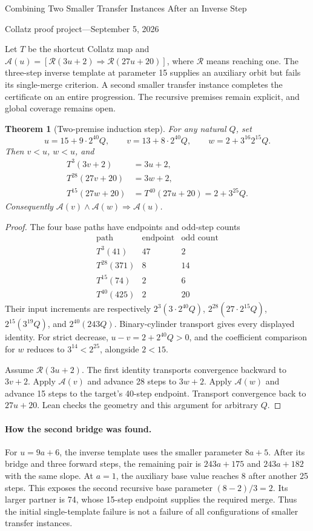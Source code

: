 \documentclass[10pt]{article}
\newtheorem{theorem}{Theorem}
\newcommand{\R}{\mathcal R}
\newcommand{\A}{\mathcal A}
\begin{document}
\begin{center}
{\Large Combining Two Smaller Transfer Instances After an Inverse Step}\par\medskip
Collatz proof project\quad---\quad September 5, 2026
\end{center}
Let $T$ be the shortcut Collatz map and
$\A(u)=[\R(3u+2)\Rightarrow\R(27u+20)]$, where $\R$ means reaching one.
The three-step inverse template at parameter 15 supplies an auxiliary orbit
but fails its single-merge criterion. A second smaller transfer instance
completes the certificate on an entire progression. The recursive premises
remain explicit, and global coverage remains open.

\begin{theorem}[Two-premise induction step]
For any natural $Q$, set
\[
 u=15+9\cdot2^{40}Q,\qquad
 v=13+8\cdot2^{40}Q,\qquad
 w=2+3^{16}2^{15}Q.
\]
Then $v<u$, $w<u$, and
\begin{align*}
 T^3(3v+2)&=3u+2,\\
 T^{28}(27v+20)&=3w+2,\\
 T^{15}(27w+20)&=T^{40}(27u+20)=2+3^{25}Q.
\end{align*}
Consequently $\A(v)\land\A(w)\Rightarrow\A(u)$.
\end{theorem}
\begin{proof}
The four base paths have endpoints and odd-step counts
\[
\begin{array}{c|c|c}
\text{path}&\text{endpoint}&\text{odd count}\\\hline
T^3(41)&47&2\\
T^{28}(371)&8&14\\
T^{15}(74)&2&6\\
T^{40}(425)&2&20
\end{array}
\]
Their input increments are respectively
$2^3(3\cdot2^{40}Q)$,
$2^{28}(27\cdot2^{15}Q)$,
$2^{15}(3^{19}Q)$, and $2^{40}(243Q)$.
Binary-cylinder transport gives every displayed identity.
For strict decrease, $u-v=2+2^{40}Q>0$, and the coefficient comparison
for $w$ reduces to $3^{14}<2^{25}$, alongside $2<15$.

Assume $\R(3u+2)$. The first identity transports convergence backward to
$3v+2$. Apply $\A(v)$ and advance 28 steps to $3w+2$. Apply $\A(w)$
and advance 15 steps to the target's 40-step endpoint. Transport convergence
back to $27u+20$. Lean checks the geometry and this argument for arbitrary $Q$.
\end{proof}

\paragraph{How the second bridge was found.}
For $u=9a+6$, the inverse template uses the smaller parameter $8a+5$.
After its bridge and three forward steps, the remaining pair is
$243a+175$ and $243a+182$ with the same slope.
At $a=1$, the auxiliary base value reaches 8 after another 25 steps.
This exposes the second recursive base parameter $(8-2)/3=2$.
Its larger partner is 74, whose 15-step endpoint supplies the required merge.
Thus the initial single-template failure is not a failure of all configurations
of smaller transfer instances.
\end{document}
